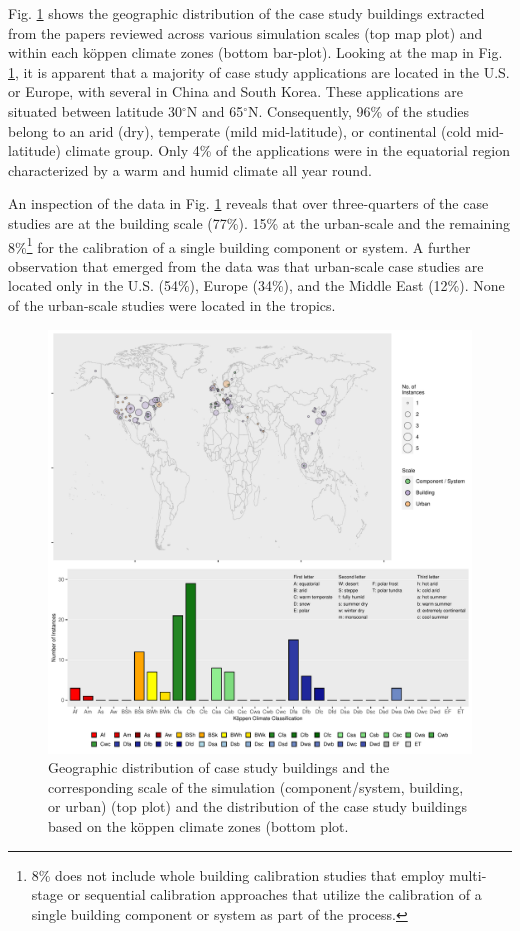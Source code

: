 \documentclass[review]{elsarticle}
\begin{document}
Fig. \ref{fig:map_climate} shows the geographic distribution of the case study buildings extracted from the papers reviewed across various simulation scales (top map plot) and within each k\"{o}ppen climate zones (bottom bar-plot). Looking at the map in Fig. \ref{fig:map_climate}, it is apparent that a majority of case study applications are located in the U.S. or Europe, with several in China and South Korea. These applications are situated between latitude 30$^{\circ}$N and 65$^{\circ}$N. Consequently, 96\% of the studies belong to an arid (dry), temperate (mild mid-latitude), or continental (cold mid-latitude) climate group. Only 4\% of the applications were in the equatorial region characterized by a warm and humid climate all year round. 

An inspection of the data in Fig. \ref{fig:map_climate} reveals that over three-quarters of the case studies are at the building scale (77\%). 15\% at the urban-scale and the remaining 8\%\footnote{8\% does not include whole building calibration studies that employ multi-stage or sequential calibration approaches that utilize the calibration of a single building component or system as part of the process.} for the calibration of a single building component or system. A further observation that emerged from the data was that urban-scale case studies are located only in the U.S. (54\%), Europe (34\%), and the Middle East (12\%). None of the urban-scale studies were located in the tropics.

\begin{figure}[!h]
\centering
\includegraphics[width=1.1\textwidth]{figures/map_climate.pdf}
\caption{Geographic distribution of case study buildings and the corresponding scale of the simulation (component/system, building, or urban) (top plot) and the distribution of the case study buildings based on the k\"{o}ppen climate zones (bottom plot.}
\label{fig:map_climate}
\end{figure}
\end{document}

